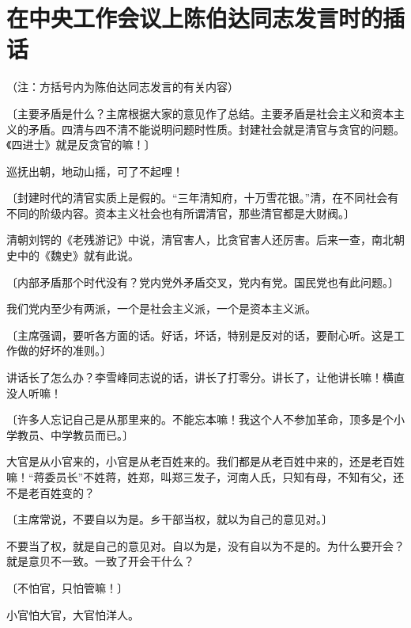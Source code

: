 \section[在中央工作会议上陈伯达同志发言时的插话（一九六四年十二月二十七日）]{在中央工作会议上陈伯达同志发言时的插话}

（注：方括号内为陈伯达同志发言的有关内容）

〔主要矛盾是什么？主席根据大家的意见作了总结。主要矛盾是社会主义和资本主义的矛盾。四清与四不清不能说明问题时性质。封建社会就是清官与贪官的问题。《四进士》就是反贪官的嘛！〕

巡抚出朝，地动山摇，可了不起哩！

〔封建时代的清官实质上是假的。“三年清知府，十万雪花银。”清，在不同社会有不同的阶级内容。资本主义社会也有所谓清官，那些清官都是大财阀。〕

清朝刘锷的《老残游记》中说，清官害人，比贪官害人还厉害。后来一查，南北朝史中的《魏史》就有此说。

〔内部矛盾那个时代没有？党内党外矛盾交叉，党内有党。国民党也有此问题。〕

我们党内至少有两派，一个是社会主义派，一个是资本主义派。

〔主席强调，要听各方面的话。好话，坏话，特别是反对的话，要耐心听。这是工作做的好坏的准则。〕

讲话长了怎么办？李雪峰同志说的话，讲长了打零分。讲长了，让他讲长嘛！横直没人听嘛！

〔许多人忘记自己是从那里来的。不能忘本嘛！我这个人不参加革命，顶多是个小学教员、中学教员而已。〕

大官是从小官来的，小官是从老百姓来的。我们都是从老百姓中来的，还是老百姓嘛！“蒋委员长”不姓蒋，姓郑，叫郑三发子，河南人氏，只知有母，不知有父，还不是老百姓变的？

〔主席常说，不要自以为是。乡干部当权，就以为自己的意见对。〕

不要当了权，就是自己的意见对。自以为是，没有自以为不是的。为什么要开会？就是意贝不一致。一致了开会干什么？

〔不怕官，只怕管嘛！〕

小官怕大官，大官怕洋人。

